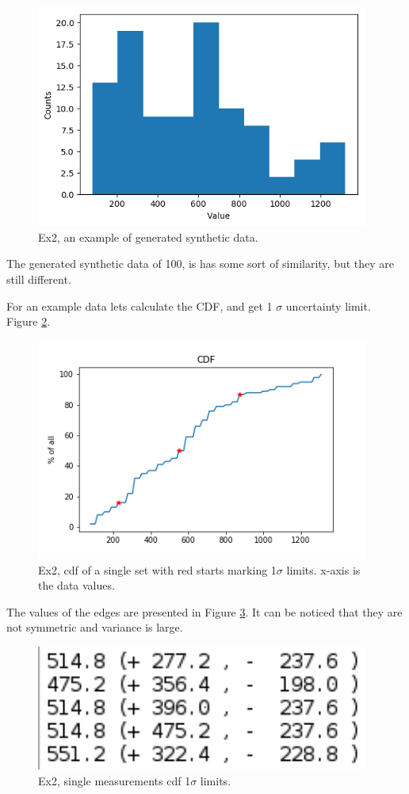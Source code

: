 \documentclass{article}
\begin{document}
\begin{figure}[!hbt]
	\centering
	\includegraphics[width=4.3in]{ex2_synt2}
	\caption{Ex2, an example of generated synthetic data.}
	\label{fig:ex2_synt2}
\end{figure}

The generated synthetic data of 100, is has some sort of similarity, but they are still different.


For an example data lets calculate the CDF, and get 1 $\sigma$ uncertainty limit. Figure \ref{fig:ex2_cdf}.

\begin{figure}[!hbt]
	\centering
	\includegraphics[width=4.3in]{ex2_cdf}
	\caption{Ex2, cdf of a single set with red starts marking 1$\sigma$ limits. x-axis is the data values.}
	\label{fig:ex2_cdf}
\end{figure}

The values of the edges are presented in Figure \ref{fig:ex2_singlecdfresult}. It can be noticed that they are not symmetric and variance is large.

\begin{figure}[!hbt]
	\centering
	\includegraphics[width=4.3in]{ex2_singlecdfresult}
	\caption{Ex2, single measurements cdf 1$\sigma$ limits.}
	\label{fig:ex2_singlecdfresult}
\end{figure}
\end{document}
